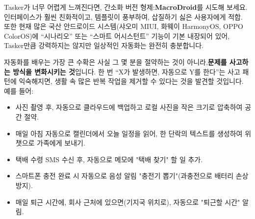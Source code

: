 Tasker가 너무 어렵게 느껴진다면, 간소화 버전 형제:\textbf{MacroDroid}를 시도해 보세요. 인터페이스가 훨씬 친화적이고, 템플릿이 풍부하여, 삽질하기 싫은 사용자에게 적합. 또한 현재 많은 국산 안드로이드 시스템(샤오미 MIUI, 화웨이 HarmonyOS, OPPO ColorOS)에 “시나리오” 또는 “스마트 어시스턴트” 기능이 기본 내장되어 있어, Tasker만큼 강력하지는 않지만 일상적인 자동화는 완전히 충분합니다.


자동화를 배우는 가장 큰 수확은 사실 그 몇 분을 절약하는 것이 아니라,\textbf{문제를 사고하는 방식을 변화시키는 것}입니다. 한 번 “X가 발생하면, 자동으로 Y를 한다”는 사고 패턴에 익숙해지면, 생활 속 많은 반복 작업을 제거할 수 있다는 것을 발견할 것입니다. 예를 들어:

\begin{itemize}
  \item 사진 촬영 후, 자동으로 클라우드에 백업하고 로컬 사진을 작은 크기로 압축하여 공간 절약.
  \item 매일 아침 자동으로 캘린더에서 오늘 일정을 읽어, 한 단락의 텍스트를 생성하여 위챗으로 가족에게 보내기.
  \item 택배 수령 SMS 수신 후, 자동으로 메모에 "택배 찾기" 할 일 추가.
  \item 스마트폰 충전 완료 시 자동으로 음성 알림 "충전기 뽑기"(과충전으로 배터리 손상 방지).
  \item 매일 퇴근 시간에, 회사 근처에 있으면(기지국 위치로), 자동으로 "퇴근할 시간" 알림.
\end{itemize}

